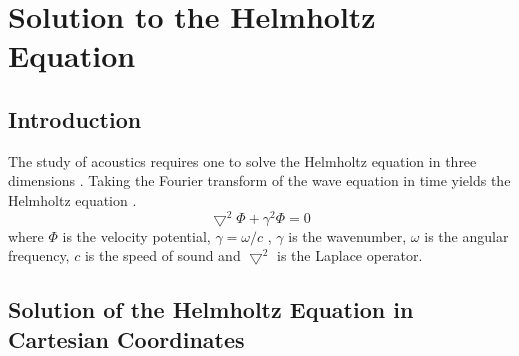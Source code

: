 \newcommand {\vr}{\vec{r}}
\newcommand {\vro}{\vec {r}_0}
\newcommand {\vy}{\vec {y}}
\newcommand {\vk}{\vec {k}}
\newcommand {\vx}{\vec{x}}
\newcommand {\vxo}{\vec {x}_0}
\chapter{Solution to the Helmholtz Equation}
\section{Introduction}
The study of acoustics  requires one to solve  the  Helmholtz equation in three dimensions \cite{gumerov2005fast}.  Taking the Fourier transform of the wave equation  in time yields  the Helmholtz equation \cite{wiki:helmholtz}.
 \begin{equation}
\label{chap2/a}
\bigtriangledown^2\Phi + \gamma^2\Phi = 0
\end{equation}
where $\Phi$ is the velocity potential, $\gamma = \omega /c$ , $\gamma$ is the wavenumber, $\omega$ is the angular frequency, $c$ is the speed of sound and  $\bigtriangledown^2$ is the Laplace operator.
\iffalse 
The Green's function $g(\vec{r},\vec{r}_0) $ is the solution to the inhomogeneous Helmholtz equation  when the input is a delta function  in space   \cite{morita1990integral,gumerov2005fast, hutchings1991prediction ,weisstein1999green,erdelyi1954tables}.
 \begin{equation}
\label{green1}
\bigtriangledown^2g + \gamma^2g = -\delta(\vec{r}-\vec{r}_0)
\end{equation}
 In Eqn (\ref{green1}),  $\vec{r}$ and  $\vec{r_0}$ are the locations of the observation point and source point, respectively. The solution assuming $e^{-iwt}$ the time dependence is    
\begin{equation}
\label{greenPlot}
g( \vr , \vr_0 )=\frac{ e^{{i\gamma}{|\vec{r}-\vec{r_0}|}}}{4\pi|\vec{r}-\vec{r_0}|}
\end{equation}
 by reciprocity property  of the Green's function 
 \begin{equation}
g( \vr , \vr{_0} ) = g( \vr{_0} , \vr )
\end{equation}
 \fi
\section {Solution of the  Helmholtz Equation in Cartesian Coordinates  }

